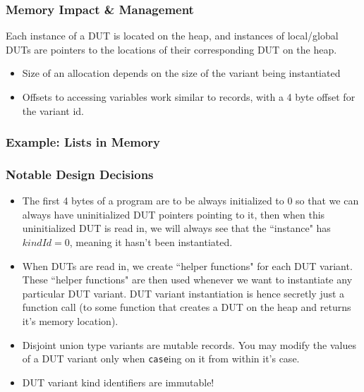 \documentclass{beamer}
\begin{document}
\begin{frame}
\frametitle{Memory Impact \& Management}

Each instance of a DUT is located on the heap, and instances of local/global DUTs are pointers to the locations of their corresponding DUT on the heap.
\begin{itemize}
 \item <1-> Size of an allocation depends on the size of the variant being instantiated
 \item Offsets to accessing variables work similar to records, with a 4 byte offset for the variant id.
\end{itemize}

\begin{figure}
  
\end{figure}
\end{frame}

\begin{frame}
\frametitle{Example: Lists in Memory}
\begin{figure}
  
\end{figure}
\end{frame}


\begin{frame}
\frametitle{Notable Design Decisions}

\begin{itemize}
 \item<1-> The first 4 bytes of a program are to be always initialized to 0 so that we can always have uninitialized DUT pointers pointing to it, then when this uninitialized DUT is read in, we will always see that the ``instance" has $kindId = 0$, meaning it hasn't been instantiated.
 \item<2-> When DUTs are read in, we create ``helper functions" for each DUT variant. These ``helper functions" are then used whenever we want to instantiate any particular DUT variant. DUT variant instantiation is hence secretly just a function call (to some function that creates a DUT on the heap and returns it's memory location).
 \item<3-> Disjoint union type variants are mutable records. You may modify the values of a DUT variant only when \texttt{case}ing on it from within it's case. 
 \item<4-> DUT variant kind identifiers are immutable!
\end{itemize}
\end{frame}
\end{document}

